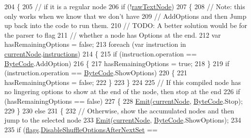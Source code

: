 \begin{DoxyCode}
204         \{
205             \textcolor{comment}{// if it is a regular node}
206             \textcolor{keywordflow}{if} (!\hyperlink{a00038_ac72e8a2a8207103d34b3d564e78fae93}{rawTextNode})
207             \{
208                 \textcolor{comment}{// Note: this only works when we know that we don't have}
209                 \textcolor{comment}{// AddOptions and then Jump up back into the code to run them.}
210                 \textcolor{comment}{// TODO: A better solution would be for the parser to flag}
211                 \textcolor{comment}{// whether a node has Options at the end.}
212                 var hasRemainingOptions = \textcolor{keyword}{false};
213                 \textcolor{keywordflow}{foreach} (var instruction \textcolor{keywordflow}{in} \hyperlink{a00038_a4368867242f493938cd6a52fe0e487b6}{currentNode}.\hyperlink{a00051_a156723a9252b62d288ddf611939ea7c3}{instructions})
214                 \{
215                     \textcolor{keywordflow}{if} (instruction.operation == \hyperlink{a00051_ad5dfb6ee68ca7469623ad3e459f98894}{ByteCode}.AddOption)
216                     \{
217                         hasRemainingOptions = \textcolor{keyword}{true};
218                     \}
219                     \textcolor{keywordflow}{if} (instruction.operation == \hyperlink{a00051_ad5dfb6ee68ca7469623ad3e459f98894}{ByteCode}.ShowOptions)
220                     \{
221                         hasRemainingOptions = \textcolor{keyword}{false};
222                     \}
223                 \}
224 
225                 \textcolor{comment}{// If this compiled node has no lingering options to show at the end of the node, then stop
       at the end}
226                 \textcolor{keywordflow}{if} (hasRemainingOptions == \textcolor{keyword}{false})
227                 \{
228                     \hyperlink{a00038_a3204aa5b87eaee776b32742df1ee28f9}{Emit}(\hyperlink{a00038_a4368867242f493938cd6a52fe0e487b6}{currentNode}, \hyperlink{a00051_ad5dfb6ee68ca7469623ad3e459f98894}{ByteCode}.Stop);
229                 \}
230                 \textcolor{keywordflow}{else}
231                 \{
232                     \textcolor{comment}{// Otherwise, show the accumulated nodes and then jump to the selected node}
233                     \hyperlink{a00038_a3204aa5b87eaee776b32742df1ee28f9}{Emit}(\hyperlink{a00038_a4368867242f493938cd6a52fe0e487b6}{currentNode}, \hyperlink{a00051_ad5dfb6ee68ca7469623ad3e459f98894}{ByteCode}.ShowOptions);
234 
235                     \textcolor{keywordflow}{if} (\hyperlink{a00038_aeba873449ff9fb1c6d731ff7eb25f0a0}{flags}.\hyperlink{a00038_ae27568d71aa82edfd7841d425969a4fb}{DisableShuffleOptionsAfterNextSet} == \textcolor{keyword}{
}
\end{DoxyCode}
